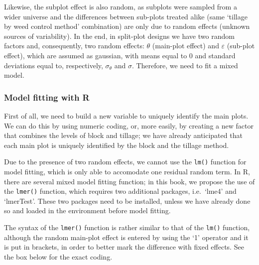 \documentclass[a4paper,12pt,oneside]{book}
\newenvironment{Shaded}{\begin{snugshade}}{\end{snugshade}}
\newcommand{\SpecialCharTok}[1]{#1}
\newcommand{\OtherTok}[1]{#1}
\newcommand{\FunctionTok}[1]{#1}
\newcommand{\NormalTok}[1]{#1}
\begin{document}
Likewise, the subplot effect is also random, as subplots were sampled from a wider universe and the differences between sub-plots treated alike (same `tillage by weed control method' combination) are only due to random effects (unknown sources of variability). In the end, in split-plot designs we have two random factors and, consequently, two random effects: \(\theta\) (main-plot effect) and \(\varepsilon\) (sub-plot effect), which are assumed as gaussian, with means equal to 0 and standard deviations equal to, respectively, \(\sigma_{\theta}\) and \(\sigma\). Therefore, we need to fit a mixed model.

\hypertarget{model-fitting-with-r-2}{%
\subsubsection{Model fitting with R}\label{model-fitting-with-r-2}}

First of all, we need to build a new variable to uniquely identify the main plots. We can do this by using numeric coding, or, more easily, by creating a new factor that combines the levels of block and tillage; we have already anticipated that each main plot is uniquely identified by the block and the tillage method.

\begin{Shaded}
\end{Shaded}

Due to the presence of two random effects, we cannot use the \texttt{lm()} function for model fitting, which is only able to accomodate one residual random term. In R, there are several mixed model fitting function; in this book, we propose the use of the \texttt{lmer()} function, which requires two additional packages, i.e.~`lme4' and `lmerTest'. These two packages need to be installed, unless we have already done so and loaded in the environment before model fitting.

The syntax of the \texttt{lmer()} function is rather similar to that of the \texttt{lm()} function, although the random main-plot effect is entered by using the `1\textbar{}' operator and it is put in brackets, in order to better mark the difference with fixed effects. See the box below for the exact coding.
\end{document}
